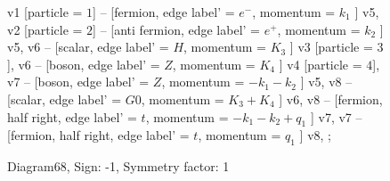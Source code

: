 \documentclass{revtex4}
\begin{document}
\begin{figure}[!htb]
\begin{center}
{    %
v1 [particle = \(1\)] -- [fermion, edge label' = \(e^{-}\), momentum = \(k_{1}\) ] v5, 
v2 [particle = \(2\)] -- [anti fermion, edge label' = \(e^{+}\), momentum = \(k_{2}\) ] v5, 
v6 -- [scalar, edge label' = \(H\), momentum = \(K_{3}\) ] v3 [particle = \(3\)], 
v6 -- [boson, edge label' = \(Z\), momentum = \(K_{4}\) ] v4 [particle = \(4\)], 
v7 -- [boson, edge label' = \(Z\), momentum = \(-k_{1} - k_{2}\) ] v5, 
v8 -- [scalar, edge label' = \(G0\), momentum = \(K_{3} + K_{4}\) ] v6, 
v8 -- [fermion, half right, edge label' = \(t\), momentum = \(-k_{1} - k_{2} + q_{1}\) ] v7, 
v7 -- [fermion, half right, edge label' = \(t\), momentum = \(q_{1}\) ] v8, 
};
\end{center}
\caption{Diagram68, Sign: -1, Symmetry factor: 1}
\end{figure}
\newpage
\end{document}
